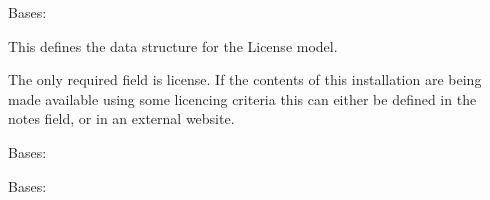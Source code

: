 \documentclass[letterpaper,10pt,english]{sphinxmanual}
\begin{document}

\begin{fulllineitems}
\label{api:mousedb.groups.models.License}
Bases: 

This defines the data structure for the License model.

The only required field is license.
If the contents of this installation are being made available using some licencing criteria this can either be defined in the notes field, or in an external website.

\begin{fulllineitems}
\label{api:mousedb.groups.models.License.DoesNotExist}
Bases: 

\end{fulllineitems}


\begin{fulllineitems}
\label{api:mousedb.groups.models.License.MultipleObjectsReturned}
Bases: 

\end{fulllineitems}


\begin{fulllineitems}
\label{api:mousedb.groups.models.License.group_set}
\end{fulllineitems}


\begin{fulllineitems}
\label{api:mousedb.groups.models.License.objects}
\end{fulllineitems}


\end{fulllineitems}
\end{document}

